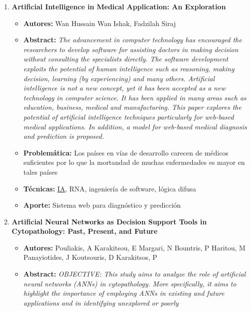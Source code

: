 \begin{enumerate}[label=\textbf{\arabic*}]
    \item \textbf{Artificial Intelligence in Medical Application: An Exploration}~\cite{HussainWanandIshakWanandFadzilah1994}
    \begin{itemize} 
        \item{\textbf{Autores:}} Wan Hussain Wan Ishak, Fadzilah Siraj
        \item{\textbf{Abstract:}} \textit{The advancement in computer technology has
        encouraged the researchers to develop software for assisting doctors in
        making decision without consulting the specialists directly. The
        software development exploits the potential of human intelligence such
        as reasoning, making decision, learning (by experiencing) and many
        others. Artificial intelligence is not a new concept, yet it has been
        accepted as a new technology in computer science. It has been applied in
        many areas such as education, business, medical and manufacturing. This
        paper explores the potential of artificial intelligence techniques
        particularly for web-based medical applications. In addition, a model
        for web-based medical diagnosis and prediction is proposed. }
        \item{\textbf{Problemática:}} Los países en vías de desarrollo carecen
        de médicos suficientes por lo que la mortandad de muchas enfermedades es
        mayor en tales países
        \item{\textbf{Técnicas:}}  \hyperlink{abbr}{IA}, RNA,
        ingeniería de software, lógica difusa
        \item{\textbf{Aporte:}} Sistema web para diagnóstico y predicción
    \end{itemize}
    \item \textbf{Artificial Neural Networks as Decision Support Tools in Cytopathology: Past, Present, and Future}~\cite{Pouliakis2016}
    \begin{itemize} 
        \item{\textbf{Autores:}} Pouliakis, A Karakitsou, E Margari, N Bountris,
        P Haritou, M Panayiotides, J Koutsouris, D Karakitsos, P
        \item{\textbf{Abstract:}} \textit{OBJECTIVE: This study aims to analyze the role
        of artificial neural networks (ANNs) in cytopathology. More
        specifically, it aims to highlight the importance of employing ANNs in
        existing and future applications and in identifying unexplored or poorly
}
\end{itemize}
\end{enumerate}
